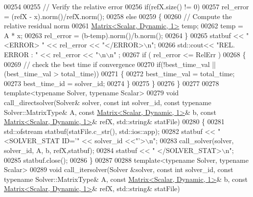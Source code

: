 \begin{DoxyCode}
00254   
00255   \textcolor{comment}{// Verify the relative error}
00256   \textcolor{keywordflow}{if}(refX.size() != 0)
00257     rel\_error = (refX - x).norm()/refX.norm();
00258   \textcolor{keywordflow}{else} 
00259   \{
00260     \textcolor{comment}{// Compute the relative residual norm}
00261     \hyperlink{group___core___module}{Matrix<Scalar, Dynamic, 1>} temp; 
00262     temp = A * x; 
00263     rel\_error = (b-temp).norm()/b.norm();
00264   \}
00265   statbuf << \textcolor{stringliteral}{"    <ERROR> "} << rel\_error << \textcolor{stringliteral}{"</ERROR>\(\backslash\)n"}; 
00266   std::cout<< \textcolor{stringliteral}{"REL. ERROR : "} << rel\_error << \textcolor{stringliteral}{"\(\backslash\)n\(\backslash\)n"} ;
00267   \textcolor{keywordflow}{if} ( rel\_error <= RelErr )
00268   \{
00269     \textcolor{comment}{// check the best time if convergence}
00270     \textcolor{keywordflow}{if}(!best\_time\_val || (best\_time\_val > total\_time))
00271     \{
00272       best\_time\_val = total\_time;
00273       best\_time\_id = solver\_id;
00274     \}
00275   \}
00276 \}
00277 
00278 \textcolor{keyword}{template}<\textcolor{keyword}{typename} Solver, \textcolor{keyword}{typename} Scalar>
00279 \textcolor{keywordtype}{void} call\_directsolver(Solver& solver, \textcolor{keyword}{const} \textcolor{keywordtype}{int} solver\_id, \textcolor{keyword}{const} \textcolor{keyword}{typename} Solver::MatrixType& A, \textcolor{keyword}{const} 
      \hyperlink{group___core___module}{Matrix<Scalar, Dynamic, 1>}& b, \textcolor{keyword}{const} 
      \hyperlink{group___core___module}{Matrix<Scalar, Dynamic, 1>}& refX, std::string& statFile)
00280 \{
00281     std::ofstream statbuf(statFile.c\_str(), std::ios::app);
00282     statbuf << \textcolor{stringliteral}{"   <SOLVER\_STAT ID='"} << solver\_id <<\textcolor{stringliteral}{"'>\(\backslash\)n"}; 
00283     call\_solver(solver, solver\_id, A, b, refX,statbuf);
00284     statbuf << \textcolor{stringliteral}{"   </SOLVER\_STAT>\(\backslash\)n"};
00285     statbuf.close();
00286 \}
00287 
00288 \textcolor{keyword}{template}<\textcolor{keyword}{typename} Solver, \textcolor{keyword}{typename} Scalar>
00289 \textcolor{keywordtype}{void} call\_itersolver(Solver &solver, \textcolor{keyword}{const} \textcolor{keywordtype}{int} solver\_id, \textcolor{keyword}{const} \textcolor{keyword}{typename} Solver::MatrixType& A, \textcolor{keyword}{const} 
      \hyperlink{group___core___module}{Matrix<Scalar, Dynamic, 1>}& b, \textcolor{keyword}{const} 
      \hyperlink{group___core___module}{Matrix<Scalar, Dynamic, 1>}& refX, std::string& statFile)

\end{DoxyCode}
